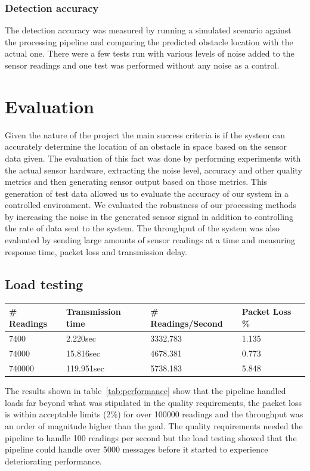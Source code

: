 \documentclass[prodmode,acmtosem]{acmsmall} %
\begin{document}
\subsubsection{Detection accuracy}
The detection accuracy was measured by running a simulated scenario against the processing pipeline and comparing the predicted obstacle location with the actual one. There were a few tests run with various levels of noise added to the sensor readings and one test was performed without any noise as a control.

\section{Evaluation}
Given the nature of the project the main success criteria is if the system can accurately determine the location of an obstacle in space based on the sensor data given. The evaluation of this fact was done by performing experiments with the actual sensor hardware, extracting the noise level, accuracy and other quality metrics and then generating sensor output based on those metrics. This generation of test data allowed us to evaluate the accuracy of our system in a controlled environment. We evaluated the robustness of our processing methods by increasing the noise in the generated sensor signal in addition to controlling the rate of data sent to the system. The throughput of the system was also evaluated by sending large amounts of sensor readings at a time and measuring response time, packet loss and transmission delay.

\subsection{Load testing}

\begin{center}
\begin{tabularx}{\textwidth}{| X | X | X | X |} 
\hline
\# Readings & Transmission time & \# Readings/Second & Packet Loss \% \\
\hline
7400 & 2.220sec & 3332.783 & 1.135 \\
\hline
74000 & 15.816sec & 4678.381 & 0.773 \\
\hline
740000 & 119.951sec & 5738.183 & 5.848 \\
\hline
\end{tabularx}
\label{tab:performance}
\end{center}

The results shown in table~\ref{tab:performance} show that the pipeline handled loads far beyond what was stipulated in the quality requirements, the packet loss is within acceptable limits (2\%) for over 100000 readings and the throughput was an order of magnitude higher than the goal. The quality requirements needed the pipeline to handle 100 readings per second but the load testing showed that the pipeline could handle over 5000 messages before it started to experience deteriorating performance.
\end{document}
